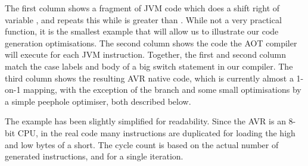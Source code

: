 The first column shows a fragment of JVM code which does a shift right of variable , and repeats this while  is greater than . While not a very practical function, it is the smallest example that will allow us to illustrate our code generation optimisations. The second column shows the code the AOT compiler will execute for each JVM instruction. Together, the first and second column match the case labels and body of a big switch statement in our compiler. The third column shows the resulting AVR native code, which is currently almost a 1-on-1 mapping, with the exception of the branch and some small optimisations by a simple peephole optimiser, both described below.

The example has been slightly simplified for readability. Since the AVR is an 8-bit CPU, in the real code many instructions are duplicated for loading the high and low bytes of a short. The cycle count is based on the actual number of generated instructions, and for a single iteration.

